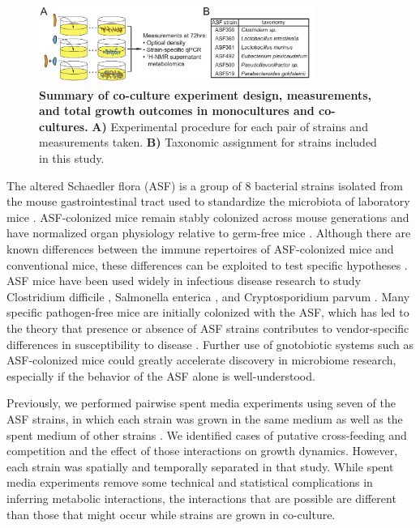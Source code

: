 \documentclass[11pt,twocolumn,notitlepage,openany,twoside]{book}
\begin{document}
\begin{refsection}
\begin{figure}[tb]
\centering
\includegraphics[width=0.8\textwidth]{ch2_fig1}
\caption[Summary of co-culture experiment design, measurements, and total growth outcomes in monocultures and co-cultures.]{\textbf{Summary of co-culture experiment design, measurements, and total growth outcomes in monocultures and co-cultures.} \textbf{A)} Experimental procedure for each pair of strains and measurements taken. \textbf{B)} Taxonomic assignment for strains included in this study.}
\end{figure}

The altered Schaedler flora (ASF) is a group of 8 bacterial strains isolated from the mouse gastrointestinal tract used to standardize the microbiota of laboratory mice \cite{Wymore_Brand2015-ez}. ASF-colonized mice remain stably colonized across mouse generations and have normalized organ physiology relative to germ-free mice \cite{Wymore_Brand2015-ez}. Although there are known differences between the immune repertoires of ASF-colonized mice and conventional mice, these differences can be exploited to test specific hypotheses \cite{Geuking2011-fj,Ivanov2009-vl}. ASF mice have been used widely in infectious disease research to study Clostridium difficile \cite{Schwan2009-zo}, Salmonella enterica \cite{Brugiroux2016-vi}, and Cryptosporidium parvum \cite{Harp1992-wr}. Many specific pathogen-free mice are initially colonized with the ASF, which has led to the theory that presence or absence of ASF strains contributes to vendor-specific differences in susceptibility to disease \cite{Singer2000-tr}.  Further use of gnotobiotic systems such as ASF-colonized mice could greatly accelerate discovery in microbiome research, especially if the behavior of the ASF alone is well-understood.

Previously, we performed pairwise spent media experiments using seven of the ASF strains, in which each strain was grown in the same medium as well as the spent medium of other strains \cite{Biggs2017-fs}. We identified cases of putative cross-feeding and competition and the effect of those interactions on growth dynamics. However, each strain was spatially and temporally separated in that study. While spent media experiments remove some technical and statistical complications in inferring metabolic interactions, the interactions that are possible are different than those that might occur while strains are grown in co-culture.


\end{refsection}
\end{document}
